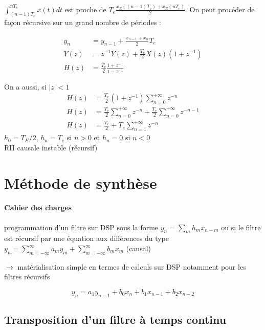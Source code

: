 \documentclass[main.tex]{subfiles}
\newcommand{\snzi}{\sum_{n=0}^{+\infty}}
\begin{document}
\begin{itemize}
\begin{exemple}
$\int_{(n-1)T_e}^{nT_e} x(t)dt$ est proche de $T_e\frac{x_E((n-1)T_e)+x_E(nT_e)}{2}$. On peut procéder de façon récursive sur un grand nombre de périodes :

\begin{align*}
y_n & = y_{n-1} + \frac{x_{n-1}+x_n}{2}T_e \\
Y(z) & = z^{-1}Y(z) + \frac{T_e}{2} X(z)(1+z^{-1}) \\
H(z) & = \frac{T_e}{2} \frac{1+z^{-1}}{1-z^{-1}}
\end{align*}

On a aussi, si $|z| < 1$
\begin{align*}
H(z) &= \frac{T_e}{2}(1+z^{-1}) \sum_{n=0}^{+\infty} z^{-n} \\
H(z) &= \frac{T_e}{2} \snzi z^{-n} + \frac{T_e}{2} \snzi z^{-n-1} \\
H(z) &= \frac{T_e}{2} + T_e \sum_{n=1}^{+\infty} z^{-n}
\end{align*}
$h_0 = T_E/2$, $h_n=T_e$ si $n>0$ et $h_n=0$ si $n<0$\\

RII causale instable (récursif)
\end{exemple}
\end{itemize}
\section{Méthode de synthèse}

\paragraph{Cahier des charges}

programmation d'un filtre sur DSP sous la forme $y_n = \sum_m h_m x_{n-m}$ ou si le filtre est récursif par une équation aux différences du type $y_n = \sum_{m=-\infty}^{\infty} a_my_m + \sum_{m=-\infty}^{\infty} b_mx_m$ (causal)

$\rightarrow$ matérialisation simple en termes de calculs sur DSP notamment pour les filtres récursifs

\begin{exemple}
\[y_n = a_1y_{n-1} + b_0x_n + b_1x_{n-1} + b_2x_{n-2}\]

\end{exemple}

\subsection{Transposition d'un filtre à temps continu}
\end{document}
